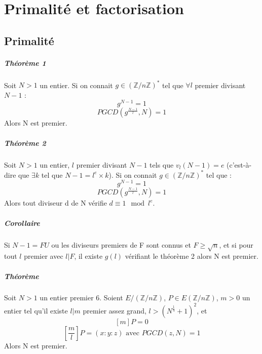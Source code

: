 \documentclass[12pt,a4paper]{report}
\begin{document}
\chapter{Primalité et factorisation}
\section{Primalité}
\paragraph{Théorème 1\\}
Soit $N>1$ un entier. Si on connait $g \in (\mathbb{Z}/n\mathbb{Z})^*$ tel que $ \forall l$ premier divisant $N-1$ :
$$ g^{N-1} = 1 $$
$$ PGCD\left(g^{\frac{N-1}{l}},N\right) = 1$$
Alors N est premier.
\paragraph{Théorème 2\\}
Soit $N>1$ un entier, $l$ premier divisant $N-1$ tels que $v_l(N-1)=e$ (c'est-à-dire que $\exists k$ tel que $ N-1 = l^e\times k$). Si on connait $g \in (\mathbb{Z}/n\mathbb{Z})^*$ tel que :
$$ g^{N-1} = 1 $$
$$ PGCD\left(g^{\frac{N-1}{l}},N\right) = 1$$
Alors tout diviseur d de N vérifie $d \equiv 1 \mod l^e$.
\paragraph{Corollaire\\}
Si $N-1 = FU$ ou les diviseurs premiers de F sont connus et $ F \geqslant  \sqrt{n}$, et si pour tout $l$ premier avec $l|F$, il existe $g(l)$ vérifiant le théorème 2 alors N est premier.
\paragraph{Théorème\\}
Soit $N>1$ un entier premier  6. Soient $ E/(\mathbb{Z}/n\mathbb{Z})$, $ P \in E(\mathbb{Z}/n \mathbb{Z})$, $m>0$ un entier tel qu'il existe $l|m$ premier assez grand, $ l > \left(N^{\frac{1}{4}} +1 \right)^2$, et 
$$ [m] P = 0 $$
$$ \left[\frac{m}{l}\right] P = (x:y:z) \mbox{ avec } PGCD(z,N)=1 $$
Alors N est premier.
\end{document}
